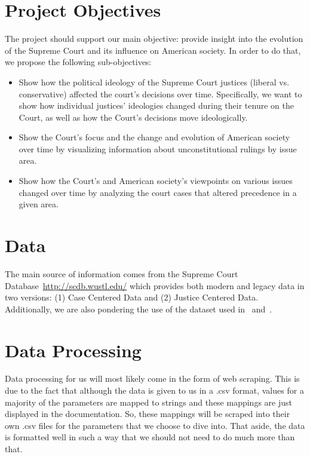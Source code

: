 \documentclass{article}
\begin{document}
\section{Project Objectives}
The project should support our main objective: provide insight into the evolution of the Supreme Court and its influence on American society. In order to do that, we propose the following sub-objectives:
\begin{itemize}
    \item Show how the political ideology of the Supreme Court justices (liberal vs. conservative) affected the court’s decisions over time. Specifically, we want to show how individual justices’ ideologies changed during their tenure on the Court, as well as how the Court's decisions move ideologically.
    \item Show the Court’s focus and the change and evolution of American society over time by visualizing information about unconstitutional rulings by issue area.
    \item Show how the Court’s and American society’s viewpoints on various issues changed over time by analyzing the court cases that altered precedence in a given area.
\end{itemize}

\section{Data}
The main source of information comes from the Supreme Court Database~\url{http://scdb.wustl.edu/} which provides both modern and legacy data in two versions: (1) Case Centered Data and (2) Justice Centered Data.\\

Additionally, we are also pondering the use of the dataset used in~\cite{fowler:2007} and~\cite{fowler:2008}.

\section{Data Processing}
Data processing for us will most likely come in the form of web scraping. This is due to the fact that although the data is given to us in a .csv format, values for a majority of the parameters are mapped to strings and these mappings are just displayed in the documentation. So, these mappings will be scraped into their own .csv files for the parameters that we choose to dive into. That aside, the data is formatted well in such a way that we should not need to do much more than that.\\
\end{document}
